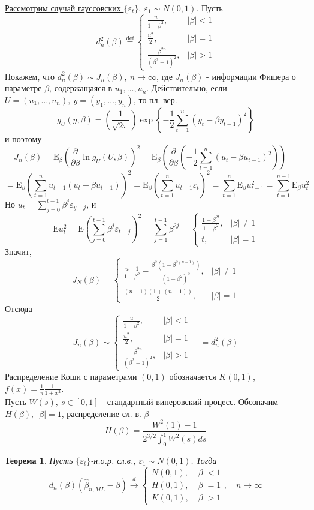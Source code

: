 \documentclass[12pt]{article}
\theoremstyle{basic_theorem}
\newtheorem{theorem}{Теорема}
\newcommand*{\defeq}{\stackrel{\text{def}}{=}}
\def\eps{ \varepsilon }
\def\E{ \mathrm{E} }
\begin{document}
\underline{Рассмотрим случай гауссовских $\{\eps_t\},\ \eps_1\sim N(0,1)$}. Пусть
\[d_n^2(\beta)\defeq\begin{cases}
    \frac{u}{1-\beta^2},& |\beta|<1 \\
    \frac{u^2}{2},& |\beta|=1 \\
    \frac{\beta^{2n}}{(\beta^2-1)^2},& |\beta|>1
\end{cases}\]
Покажем, что $d_n^2(\beta)\sim J_n(\beta),\ n\rightarrow\infty$,
где $J_n(\beta)$ - информации Фишера о параметре $\beta$,
содержащаяся в $u_1,\ldots,u_n$. Действительно,
если $U=(u_1,\ldots,u_n),\ y=(y_1,\ldots,y_n)$, то пл. вер.
\[g_U(y,\beta)=\left(\frac{1}{\sqrt{2\pi}}\right)\exp{\left\{-\frac{1}{2}\sum_{t=1}^n(y_t-\beta y_{t-1})^2\right\}}\]
и поэтому
\[J_n(\beta)=\E_{\beta}\left(\frac{\partial}{\partial\beta}\ln g_U(U,\beta)\right)^2=\E_\beta\left(\frac{\partial}{\partial\beta}\left(-\frac{1}{2}\sum_{t=1}^n(u_t-\beta u_{t-1})^2\right)\right)=\]
\[=\E_\beta\left(\sum_{t=1}^nu_{t-1}(u_t-\beta u_{t-1})\right)^2=\E_\beta\left(\sum_{t=1}^nu_{t-1}\eps_t\right)^2=\sum_{t=1}^n\E_\beta u^2_{t-1}=\sum_{t=1}^{n-1}\E_\beta u^2_{t}\]
Но $u_t=\sum_{j=0}^{t-1}\beta^j\eps_{y-j}$, и
\[\E u_t^2=\E(\sum_{j=0}^{t-1}\beta^j\eps_{t-j})^2=\sum_{j=1}^{t-1}\beta^{2j}=\begin{cases}
    \frac{1-\beta^{2t}}{1-\beta^2},& |\beta|\neq1 \\
    t,& |\beta|=1
\end{cases}\]
Значит,
\[J_N(\beta)=\begin{cases}
    \frac{u-1}{1-\beta^2}-\frac{\beta^2(1-\beta^{2(n-1)})}{(1-\beta^2)^2},& |\beta|\neq1\\
    \frac{(n-1)(1+(n-1))}{2},& |\beta| =1
\end{cases}\]
Отсюда
\[
    J_n(\beta)\sim\begin{cases}
        \frac{u}{1-\beta^2},& |\beta|<1 \\
        \frac{u^2}{2},& |\beta|=1 \\
        \frac{\beta^{2n}}{(\beta^2-1)^2},& |\beta|>1
    \end{cases}
    \quad =d^2_n(\beta)
\]
Распределение Коши с параметрами $(0,1)$ обозначается $K(0,1)$, $f(x)=\frac{1}{\pi}\frac{1}{1+x^2}$. \\
Пусть $W(s),\ s\in[0,1]$ - стандартный винеровский процесс.
Обозначим $H(\beta),\ |\beta|=1$, распределение сл. в. $\beta$
\[H(\beta)=\frac{W^2(1)-1}{2^{3/2}\int_0^1W^2(s)ds}\]
\begin{theorem}
    Пусть $\{\eps_t\}$-н.о.р. сл.в., $\eps_1\sim N(0,1)$. Тогда
    \[d_n(\beta)(\widehat{\beta}_{n,ML}-\beta)\xrightarrow{d}\begin{cases}
        N(0,1),& |\beta|<1 \\
        H(0,1),& |\beta|=1 \\
        K(0,1),& |\beta|>1 
    \end{cases}, \quad n\rightarrow\infty\]
\end{theorem}
\end{document}
